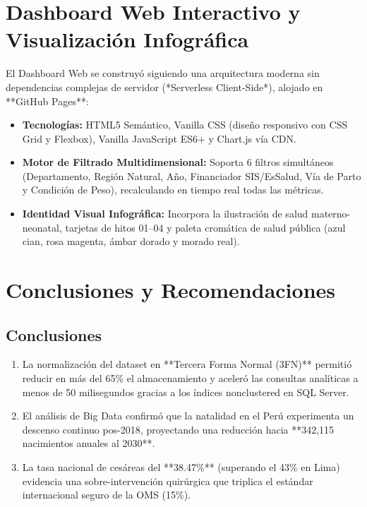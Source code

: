 \documentclass[12pt,a4paper]{article}
\begin{document}
\section{Dashboard Web Interactivo y Visualización Infográfica}

El Dashboard Web se construyó siguiendo una arquitectura moderna sin dependencias complejas de servidor (*Serverless Client-Side*), alojado en **GitHub Pages**:

\begin{itemize}
    \item \textbf{Tecnologías:} HTML5 Semántico, Vanilla CSS (diseño responsivo con CSS Grid y Flexbox), Vanilla JavaScript ES6+ y Chart.js vía CDN.
    \item \textbf{Motor de Filtrado Multidimensional:} Soporta 6 filtros simultáneos (Departamento, Región Natural, Año, Financiador SIS/EsSalud, Vía de Parto y Condición de Peso), recalculando en tiempo real todas las métricas.
    \item \textbf{Identidad Visual Infográfica:} Incorpora la ilustración de salud materno-neonatal, tarjetas de hitos 01--04 y paleta cromática de salud pública (azul cian, rosa magenta, ámbar dorado y morado real).
\end{itemize}

\section{Conclusiones y Recomendaciones}

\subsection{Conclusiones}
\begin{enumerate}
    \item La normalización del dataset en **Tercera Forma Normal (3FN)** permitió reducir en más del 65\% el almacenamiento y aceleró las consultas analíticas a menos de 50 milisegundos gracias a los índices nonclustered en SQL Server.
    \item El análisis de Big Data confirmó que la natalidad en el Perú experimenta un descenso continuo pos-2018, proyectando una reducción hacia **342,115 nacimientos anuales al 2030**.
    \item La tasa nacional de cesáreas del **38.47\%** (superando el 43\% en Lima) evidencia una sobre-intervención quirúrgica que triplica el estándar internacional seguro de la OMS (15\%).
\end{enumerate}
\end{document}
